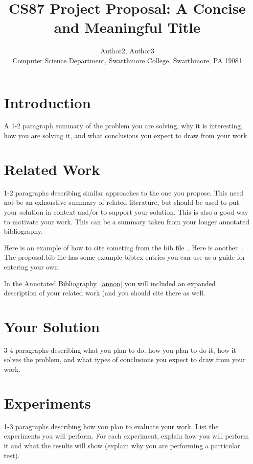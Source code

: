 \documentclass[11pt]{article}
\begin{document}

\title{CS87 Project Proposal: A Concise and Meaningful Title}

\author{Author2, Author3 \\ 
Computer Science Department, Swarthmore College, Swarthmore, PA  19081}

\maketitle

\section {Introduction}\label{intro} 
A 1-2 paragraph summary of the problem you are solving, why it is interesting,
how you are solving it, and what conclusions 
you expect to draw from your work.

\section {Related Work}\label{rel}
1-2 paragraphs describing similar approaches to the one you propose. This need
not be an exhaustive summary of related literature, but should be used to put
your solution in context and/or to support your solution. This is also a good
way to motivate your work. This can be a summary taken from your longer
annotated bibliography.  

Here is an example of how to cite someting from the bib 
file~\cite{newhall:nswap2L}.  Here is another~\cite{unixV}.  
The proposal.bib file has some example 
bibtex entries you can use as a guide for entering your own.

In the Annotated Bibliography~\ref{annon} you will included an expanded description of your related work (and you should cite there as well.

\section {Your Solution}\label{soln}
3-4 paragraphs describing what you plan to do, how you plan to do it, how it
solves the problem, and what types of conclusions you expect to draw from your
work.

\section {Experiments}\label{exper}
1-3 paragraphs describing how you plan to evaluate your work. List the
experiments you will perform. For each experiment, explain how you will perform
it and what the results will show (explain why you are performing a particular
test).
\end{document}
